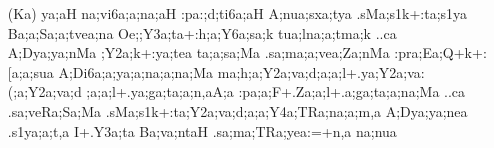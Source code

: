 \begin{itemize}
\begin{itemize}
                \item[({\sktf Ka})] {\sktf ya;aH na;vi6a;a;na;aH
:pa:;d;ti6a;aH A;nua;sxa;tya .sMa;s1k+:ta;s1ya Ba;a;Sa;a;tvea;na Oe;;Y3a;ta\ZF{-}+:h;a;Y6a;sa;k%
 tua;lna;a;tma;k ..ca A;Dya;ya;nMa ;Y2a;k+:ya;tea\ZF{,}
ta;a;sa;Ma .sa;ma;a;vea;Za;nMa :pra;Ea;Q+k+:[a;a;sua A;Di6a;a;ya;a;na;a;na;Ma
ma;h;a;Y2a;va;d;a;a;l+.ya\ZF{-};Y2a;va:(;a;Y2a;va;d%
;a;a;l+.ya;ga;ta;a;n,aA;a :pa;a;F+.Za;a;l+.a;ga;ta;a;na;Ma ..ca .sa;veRa;Sa;Ma
.sMa;s1k+:ta;Y2a;va;d;a;a;Y4a;TRa;na;a;m,a
A;Dya;ya;nea .s1ya;a;t,a\ZF{,} I+.Y3a;ta Ba;va;ntaH .sa;ma;TRa;yea:=+n,a
na;nua }
                \end{itemize}
\end{itemize}

